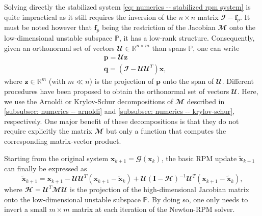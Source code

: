    Solving directly the stabilized system \eqref{eq: numerics -- stabilized rpm system} is quite impractical as it still requires the inversion of the $n \times n$ matrix $\mathbfcal{I} - \bm{f}_p$. It must be noted however that $\bm{f}_p$ being the restriction of the Jacobian $\mathbfcal{M}$ onto the low-dimensional unstable subspace $\mathbb{P}$, it has a low-rank structure. Consequently, given an orthonormal set of vectors $\mathbfcal{U} \in \mathbb{R}^{n \times m}$ than spans $\mathbb{P}$, one can write
    \begin{equation}
      \begin{aligned}
        & \mathbf{p} = \mathbfcal{U} \mathbf{z} \\
        & \mathbf{q} = \left( \mathbfcal{I} - \mathbfcal{U}\mathbfcal{U}^T \right) \mathbf{x},
      \end{aligned}
    \end{equation}
    where $\mathbf{z} \in \mathbb{R}^m$ (with $m \ll n$) is the projection of $\mathbf{p}$ onto the span of $\mathbfcal{U}$. Different procedures have been proposed to obtain the orthonormal set of vectors $\mathbfcal{U}$. Here, we use the Arnoldi or Krylov-Schur decompositions of $\mathbfcal{M}$ described in \textsection \ref{subsubsec: numerics -- arnoldi} and \textsection \ref{subsubsec: numerics -- krylov-schur}, respectively. One major benefit of these decompositions is that they do not require explicitly the matrix $\mathbfcal{M}$ but only a function that computes the corresponding matrix-vector product.

    Starting from the original system $\mathbf{x}_{k+1} = \mathbfcal{G}(\mathbf{x}_k)$, the basic RPM update $\tilde{\mathbf{x}}_{k+1}$ can finally be expressed as
    \begin{equation}
      \tilde{\mathbf{x}}_{k+1} = \mathbf{x}_{k+1} - \mathbfcal{U}\mathbfcal{U}^T \left( \mathbf{x}_{k+1} - \tilde{\mathbf{x}}_k \right) + \mathbfcal{U} \left( \mathbf{I} - \mathbfcal{H} \right)^{-1} \mathbfcal{U}^T \left( \mathbf{x}_{k+1} - \tilde{\mathbf{x}}_k \right),
      \label{eq: numerics -- basic rpm iteration}
    \end{equation}
    where $\mathbfcal{H} = \mathbfcal{U}^T \mathbfcal{M} \mathbfcal{U}$ is the projection of the high-dimensional Jacobian matrix onto the low-dimensional unstable subspace $\mathbb{P}$. By doing so, one only needs to invert a small $m \times m$ matrix at each iteration of the Newton-RPM solver.

